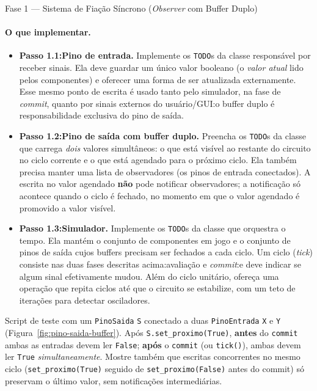 \documentclass[11pt,a4paper]{article}
\begin{document}
\begin{phasebox}{Fase 1 — Sistema de Fiação Síncrono (\textit{Observer} com Buffer Duplo)}{}
\paragraph{O que implementar.}
\begin{itemize}
    \item \textbf{Passo 1.1:Pino de entrada.} Implemente os \texttt{TODO}s da classe responsável por receber sinais. Ela deve guardar um único valor booleano (o \emph{valor atual} lido pelos componentes) e oferecer uma forma de ser atualizada externamente. Esse mesmo ponto de escrita é usado tanto pelo simulador, na fase de \textit{commit}, quanto por sinais externos do usuário/GUI:o buffer duplo é responsabilidade exclusiva do pino de saída.
    \item \textbf{Passo 1.2:Pino de saída com buffer duplo.} Preencha os \texttt{TODO}s da classe que carrega \emph{dois} valores simultâneos: o que está visível ao restante do circuito no ciclo corrente e o que está agendado para o próximo ciclo. Ela também precisa manter uma lista de observadores (os pinos de entrada conectados). A escrita no valor agendado \textbf{não} pode notificar observadores; a notificação só acontece quando o ciclo é fechado, no momento em que o valor agendado é promovido a valor visível.
    \item \textbf{Passo 1.3:Simulador.} Implemente os \texttt{TODO}s da classe que orquestra o tempo. Ela mantém o conjunto de componentes em jogo e o conjunto de pinos de saída cujos buffers precisam ser fechados a cada ciclo. Um ciclo (\emph{tick}) consiste nas duas fases descritas acima:avaliação e \textit{commit}:e deve indicar se algum sinal efetivamente mudou. Além do ciclo unitário, ofereça uma operação que repita ciclos até que o circuito se estabilize, com um teto de iterações para detectar osciladores.
\end{itemize}

\begin{acceptbox}
\vspace{2pt}
Script de teste com um \texttt{PinoSaida} \texttt{S} conectado a duas \texttt{PinoEntrada} \texttt{X} e \texttt{Y} (Figura~\ref{fig:pino-saida-buffer}). Após \texttt{S.set\_proximo(True)}, \textbf{antes} do \texttt{commit} ambas as entradas devem ler \texttt{False}; \textbf{após} o \texttt{commit} (ou \texttt{tick()}), ambas devem ler \texttt{True} \emph{simultaneamente}. Mostre também que escritas concorrentes no mesmo ciclo (\texttt{set\_proximo(True)} seguido de \texttt{set\_proximo(False)} antes do commit) só preservam o último valor, sem notificações intermediárias.
\end{acceptbox}
\end{phasebox}
\end{document}
